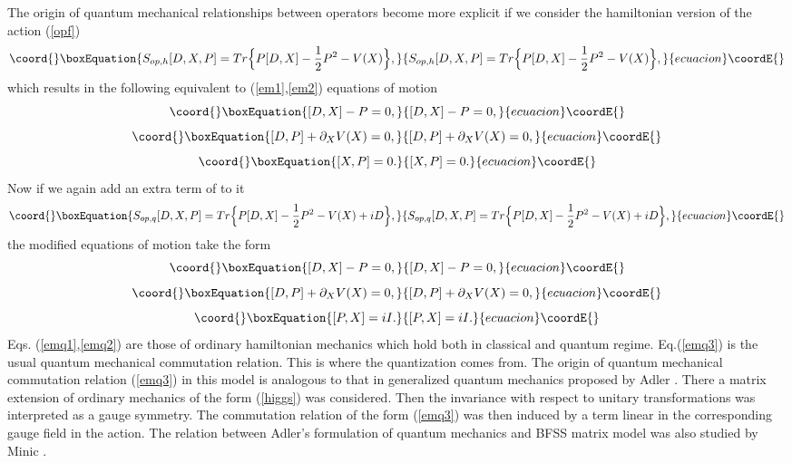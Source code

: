 \documentclass[a4paper,11pt]{article}
\begin{document}
 The origin of quantum mechanical relationships between operators
 become more explicit if we consider the hamiltonian version of the
action (\ref{opf})
\begin{equation}\coord{}\boxEquation{
S_{op,h}[D,X,P]=Tr \Big\{ P[D,X]-\frac{1}{2}P^2 - V(X)    \Big\},
\label{opfh}
}{
S_{op,h}[D,X,P]=Tr \Big\{ P[D,X]-\frac{1}{2}P^2 - V(X)    \Big\},
}{ecuacion}\coordE{}\end{equation}
which results in the following equivalent to (\ref{em1},\ref{em2})
equations of motion
\begin{equation}\coord{}\boxEquation{
[D,X]-P=0, \label{emh1}
}{
[D,X]-P=0, }{ecuacion}\coordE{}\end{equation}
\begin{equation}\coord{}\boxEquation{
[D,P] + \partial_X V(X)=0, \label{emh2}
}{
[D,P] + \partial_X V(X)=0, }{ecuacion}\coordE{}\end{equation}
\begin{equation}\coord{}\boxEquation{
[X,P]=0. \label{emh3}
}{
[X,P]=0. }{ecuacion}\coordE{}\end{equation}
Now if we again add an extra term of \coordHE{} to it
\begin{equation}\coord{}\boxEquation{
S_{op,q}[D,X,P]=Tr \Big\{ P[D,X]-\frac{1}{2}P^2 - V(X)+iD \Big\},
\label{opfq}
}{
S_{op,q}[D,X,P]=Tr \Big\{ P[D,X]-\frac{1}{2}P^2 - V(X)+iD \Big\},
}{ecuacion}\coordE{}\end{equation}
the modified equations of motion take the form
\begin{equation}\coord{}\boxEquation{
[D,X]-P=0, \label{emq1}
}{
[D,X]-P=0, }{ecuacion}\coordE{}\end{equation}
\begin{equation}\coord{}\boxEquation{
[D,P] + \partial_X V(X)=0, \label{emq2}
}{
[D,P] + \partial_X V(X)=0, }{ecuacion}\coordE{}\end{equation}
\begin{equation}\coord{}\boxEquation{
[P,X]=iI. \label{emq3}
}{
[P,X]=iI. }{ecuacion}\coordE{}\end{equation}
Eqs. (\ref{emq1},\ref{emq2}) are those of ordinary hamiltonian
mechanics which hold both in classical and quantum regime.
Eq.(\ref{emq3}) is the usual quantum mechanical commutation
relation. This is where the quantization comes from. The origin of
quantum mechanical commutation relation (\ref{emq3}) in this model
is analogous to that in generalized quantum mechanics proposed by
Adler \cite{adlerbook}. There a matrix extension of ordinary
mechanics of the form (\ref{higgs}) was considered. Then the
invariance with respect to unitary transformations was interpreted
as a gauge symmetry. The commutation relation of the form
(\ref{emq3}) was then induced by a term linear in the
corresponding gauge field in the action. The relation between
Adler's formulation of quantum mechanics and BFSS matrix model was
also studied by Minic \cite{minic}.
\end{document}
